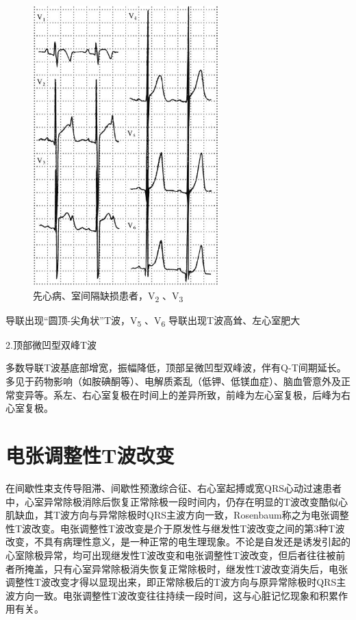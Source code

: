 \begin{figure}[!htbp]
 \centering
 \includegraphics[width=2.82292in,height=4.26042in]{./images/Image00104.jpg}
 \captionsetup{justification=centering}
 \caption{先心病、室间隔缺损患者，V\textsubscript{2} 、V\textsubscript{3}}
 \label{fig6-12}
  \end{figure} 
导联出现“圆顶-尖角状”T波，V\textsubscript{5} 、V\textsubscript{6}
导联出现T波高耸、左心室肥大

2.顶部微凹型双峰T波

多数导联T波基底部增宽，振幅降低，顶部呈微凹型双峰波，伴有Q-T间期延长。多见于药物影响（如胺碘酮等）、电解质紊乱（低钾、低镁血症）、脑血管意外及正常变异等。系左、右心室复极在时间上的差异所致，前峰为左心室复极，后峰为右心室复极。

\protect\hypertarget{text00012.htmlux5cux23subid95}{}{}

\section{电张调整性T波改变}

在间歇性束支传导阻滞、间歇性预激综合征、右心室起搏或宽QRS心动过速患者中，心室异常除极消除后恢复正常除极一段时间内，仍存在明显的T波改变酷似心肌缺血，其T波方向与异常除极时QRS主波方向一致，Rosenbaum称之为电张调整性T波改变。电张调整性T波改变是介于原发性与继发性T波改变之间的第3种T波改变，不具有病理性意义，是一种正常的电生理现象。不论是自发还是诱发引起的心室除极异常，均可出现继发性T波改变和电张调整性T波改变，但后者往往被前者所掩盖，只有心室异常除极消失恢复正常除极时，继发性T波改变消失后，电张调整性T波改变才得以显现出来，即正常除极后的T波方向与原异常除极时QRS主波方向一致。电张调整性T波改变往往持续一段时间，这与心脏记忆现象和积累作用有关。

